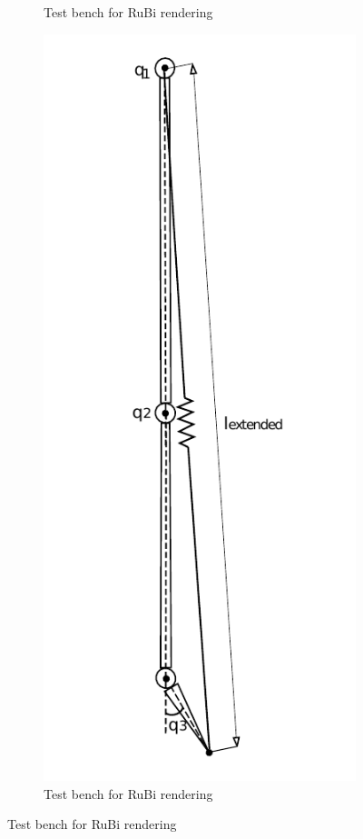 \begin{figure}[ht!]
\begin{subfigure}[b]{0.25\textwidth}
        \caption{Test bench for RuBi rendering}
        \label{fig:virtual_spring2}
    \end{subfigure}
    \begin{subfigure}[b]{0.25\textwidth}
        \includegraphics[width=\textwidth]{figures//spring_model_max_extended.pdf}
        \caption{Test bench for RuBi rendering}
        \label{fig:virtual_spring3}
    \end{subfigure}
\end{figure}  


